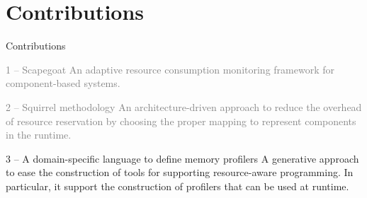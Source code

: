 \documentclass[10pt,xcolor={dvipsnames}]{beamer}
\begin{document}
\newcommand{\kw}[1]{\textbf{\color{blue} #1}}

	\section{Contributions}

	\begin{frame}{Contributions}
		\begin{scriptsize}
			\begin{block}{\textcolor{gray}{1 -- Scapegoat}}
				\textcolor{gray}{An adaptive resource consumption monitoring framework for component-based systems.}
			\end{block}
			\begin{block}{\textcolor{gray}{2 -- Squirrel methodology}}
				\textcolor{gray}{An architecture-driven approach to reduce the overhead of resource reservation by choosing the proper mapping to represent components in the runtime.}
			\end{block}
		\end{scriptsize}
		
		
		\vspace{0.2cm}
		\begin{block}{{\large 3 -- A domain-specific language to define memory profilers}}
			A generative approach to ease the construction of tools for supporting resource-aware programming. In particular, it support the construction of profilers that can be used at runtime.
		\end{block}
		
		
	\end{frame}
\end{document}
